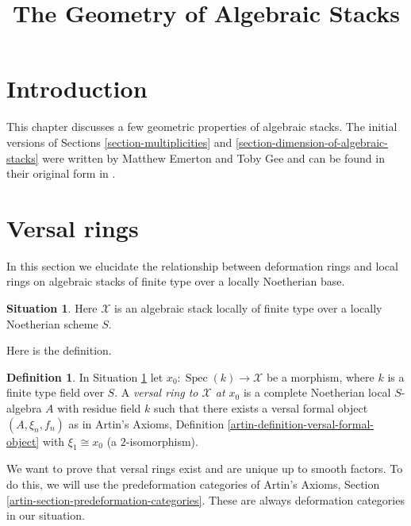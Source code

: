\documentclass{stacks-project}
\theoremstyle{plain}
\theoremstyle{definition}
\newtheorem{definition}[subsection]{Definition}
\newtheorem{situation}[subsection]{Situation}
\theoremstyle{remark}
\numberwithin{equation}{subsection}
\def\Spec{\mathop{\mathrm{Spec}}}
\begin{document}
\title{The Geometry of Algebraic Stacks}


\maketitle

\label{section-phantom}

\tableofcontents

\section{Introduction}
\label{section-introduction}

\noindent
This chapter discusses a few geometric properties of algebraic stacks.
The initial versions of Sections \ref{section-multiplicities} and
\ref{section-dimension-of-algebraic-stacks}
were written by Matthew Emerton and Toby Gee and can be found
in their original form in \cite{Emerton-Gee-dim}.







\section{Versal rings}
\label{section-versal}

\noindent
In this section we elucidate the relationship between deformation rings
and local rings on algebraic stacks of finite type over a locally
Noetherian base.

\begin{situation}
\label{situation-versal}
Here $\mathcal{X}$ is an algebraic stack locally of finite type
over a locally Noetherian scheme $S$.
\end{situation}

\noindent
Here is the definition.

\begin{definition}
\label{definition-versal-ring-at-x}
In Situation \ref{situation-versal} let $x_0 : \Spec(k) \to \mathcal{X}$
be a morphism, where $k$ is a finite type field over $S$.
A {\it versal ring to $\mathcal{X}$ at $x_0$} is a complete
Noetherian local $S$-algebra $A$ with residue field $k$
such that there exists a versal formal object
$(A, \xi_n, f_n)$ as in Artin's Axioms, Definition
\ref{artin-definition-versal-formal-object}
with $\xi_1 \cong x_0$ (a $2$-isomorphism).
\end{definition}

\noindent
We want to prove that versal rings exist and are unique up to
smooth factors. To do this, we will use the predeformation categories of
Artin's Axioms, Section \ref{artin-section-predeformation-categories}.
These are always deformation categories in our situation.
\end{document}
